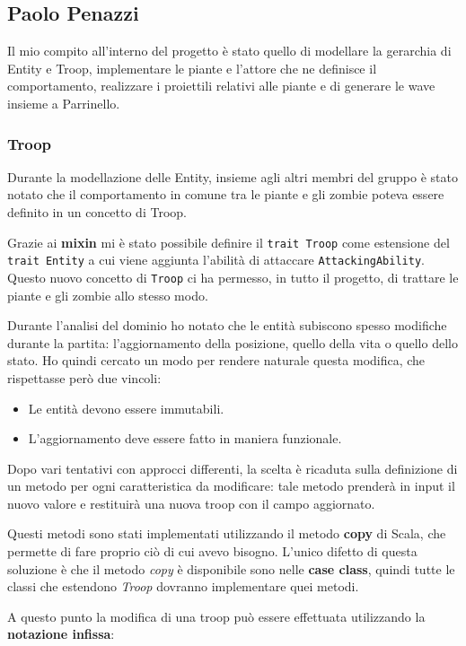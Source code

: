 \subsection{Paolo Penazzi}
Il mio compito all’interno del progetto è stato quello di modellare la gerarchia di Entity e Troop,
implementare le piante e l'attore che ne definisce il comportamento, realizzare i proiettili relativi alle piante e di generare le wave insieme a Parrinello.

\subsubsection{Troop}
Durante la modellazione delle Entity, insieme agli altri membri del gruppo è stato notato che il comportamento in comune tra le piante e gli zombie poteva essere definito in un concetto di Troop.

Grazie ai \textbf{mixin} mi è stato possibile definire il \texttt{trait Troop} come estensione del \texttt{trait Entity}
a cui viene aggiunta l'abilità di attaccare \texttt{AttackingAbility}.
Questo nuovo concetto di \texttt{Troop} ci ha permesso, in tutto il progetto, di trattare le piante e gli zombie allo stesso modo.

Durante l'analisi del dominio ho notato che le entità subiscono spesso modifiche durante la partita: l'aggiornamento della posizione, quello della vita o quello dello stato.
Ho quindi cercato un modo per rendere naturale questa modifica, che rispettasse però due vincoli:
\begin{itemize}
    \item Le entità devono essere immutabili.
    \item L'aggiornamento deve essere fatto in maniera funzionale.
\end{itemize}
Dopo vari tentativi con approcci differenti, la scelta è ricaduta sulla definizione di un metodo per ogni caratteristica da modificare: tale metodo prenderà in input il nuovo valore e restituirà una nuova troop con il campo aggiornato.

Questi metodi sono stati implementati utilizzando il metodo \textbf{copy} di Scala, che permette di fare proprio ciò di cui avevo bisogno.
L'unico difetto di questa soluzione è che il metodo \textit{copy} è disponibile sono nelle \textbf{case class}, quindi tutte le classi che estendono \textit{Troop} dovranno implementare quei metodi.

A questo punto la modifica di una troop può essere effettuata utilizzando la \textbf{notazione infissa}:

